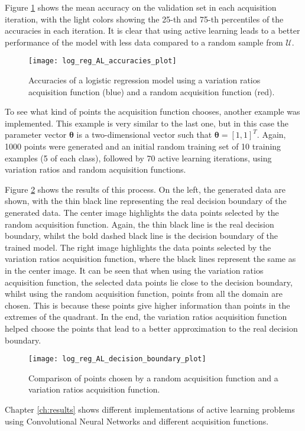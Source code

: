 Figure \ref{fig:log_reg_AL_accuracies_plot} shows the mean accuracy on the validation set in each acquisition iteration, with the light colors showing the 25-th and 75-th percentiles of the accuracies in each iteration. It is clear that using active learning leads to a better performance of the model with less data compared to a random sample from $\mathcal{U}$.

\begin{figure}[H]
    \centering
    \texttt{[image: log\_reg\_AL\_accuracies\_plot]}
    \caption{Accuracies of a logistic regression model using a variation ratios acquisition function (blue) and a random acquisition function (red).}
    \label{fig:log_reg_AL_accuracies_plot}
\end{figure}

To see what kind of points the acquisition function chooses, another example was implemented. This example is very similar to the last one, but in this case the parameter vector $\boldsymbol{\theta}$ is a two-dimensional vector such that $\boldsymbol{\theta} = \left[ 1, 1 \right]^T$. Again, 1000 points were generated and an initial random training set of 10 training examples (5 of each class), followed by 70 active learning iterations, using variation ratios and random acquisition functions.

Figure \ref{fig:log_reg_AL_decision_boundary_plot} shows the results of this process. On the left, the generated data are shown, with the thin black line representing the real decision boundary of the generated data. The center image highlights the data points selected by the random acquisition function. Again, the thin black line is the real decision boundary, whilst the bold dashed black line is the decision boundary of the trained model. The right image highlights the data points selected by the variation ratios acquisition function, where the black lines represent the same as in the center image. It can be seen that when using the variation ratios acquisition function, the selected data points lie close to the decision boundary, whilst using the random acquisition function, points from all the domain are chosen. This is because these points give higher information than points in the extremes of the quadrant. In the end, the variation ratios acquisition function helped choose the points that lead to a better approximation to the real decision boundary.

\begin{figure}[H]
    \centering
    \texttt{[image: log\_reg\_AL\_decision\_boundary\_plot]}
    \caption{Comparison of points chosen by a random acquisition function and a variation ratios acquisition function.}
    \label{fig:log_reg_AL_decision_boundary_plot}
\end{figure}

Chapter \ref{ch:results} shows different implementations of active learning problems using Convolutional Neural Networks and different acquisition functions.
